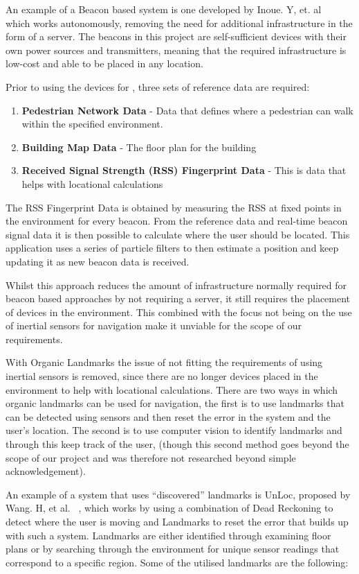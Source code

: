 \documentclass[main.tex]{subfiles}
\begin{document}
An example of a Beacon based system is one developed by Inoue. Y, et. al ~\cite{Inoue2009} which works autonomously, removing the need for additional infrastructure in the form of a server. The beacons in this project are self-sufficient devices with their own power sources and transmitters, meaning that the required infrastructure is low-cost and able to be placed in any location.

Prior to using the devices for , three sets of reference data are required:

\begin{enumerate}
	\item \textbf{Pedestrian Network Data} - Data that defines where a pedestrian can walk within the specified environment.
	\item \textbf{Building Map Data} - The floor plan for the building
	\item \textbf{Received Signal Strength (RSS) Fingerprint Data} - This is data that helps with locational calculations
\end{enumerate}

The RSS Fingerprint Data is obtained by measuring the RSS at fixed points in the environment for every beacon. From the reference data and real-time beacon signal data it is then possible to calculate where the user should be located. This application uses a series of particle filters to then estimate a position and keep updating it as new beacon data is received.

Whilst this approach reduces the amount of infrastructure normally required for beacon based approaches by not requiring a server, it still requires the placement of devices in the environment. This combined with the focus not being on the use of inertial sensors for navigation make it unviable for the scope of our requirements.

With Organic Landmarks the issue of not fitting the requirements of using inertial sensors is removed, since there are no longer devices placed in the environment to help with locational calculations. There are two ways in which organic landmarks can be used for navigation, the first is to use landmarks that can be detected using sensors and then reset the error in the system and the user's location. The second is to use computer vision to identify landmarks and through this keep track of the user, (though this second method goes beyond the scope of our project and was therefore not researched beyond simple acknowledgement).

An example of a system that uses ``discovered'' landmarks is UnLoc, proposed by Wang. H, et al. ~\cite{wanf2012no}, which works by using a combination of Dead Reckoning to detect where the user is moving and Landmarks to reset the error that builds up with such a system. Landmarks are either identified through examining floor plans or by searching through the environment for unique sensor readings that correspond to a specific region. Some of the utilised landmarks are the following:
\end{document}

